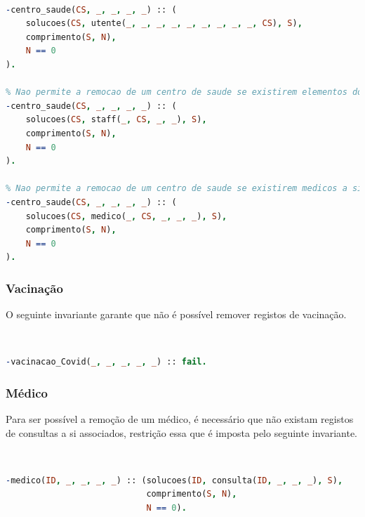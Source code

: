 \documentclass[a4paper, 11pt]{article}
\begin{document}
\

\begin{lstlisting}[language=Prolog, caption={Invariantes de remoção relativos ao predicado \texttt{centro\_saude}}]
% Nao permite a remocao de um centro de saude se existirem utentes a si associaos
-centro_saude(CS, _, _, _, _) :: (
    solucoes(CS, utente(_, _, _, _, _, _, _, _, _, CS), S),
    comprimento(S, N),
    N == 0
).

% Nao permite a remocao de um centro de saude se existirem elementos do staff a si associaos
-centro_saude(CS, _, _, _, _) :: (
    solucoes(CS, staff(_, CS, _, _), S),
    comprimento(S, N),
    N == 0
).

% Nao permite a remocao de um centro de saude se existirem medicos a si associaos
-centro_saude(CS, _, _, _, _) :: (
    solucoes(CS, medico(_, CS, _, _, _), S),
    comprimento(S, N),
    N == 0
).
\end{lstlisting}

\subsubsection*{Vacinação}

O seguinte invariante garante que não é possível remover registos de vacinação.

\

\begin{lstlisting}[language=Prolog, caption={Invariante de remoção relativos ao predicado \texttt{vacinacao\_covid}}]
% Nao permite a remocao de registos de atos de vacinacao
-vacinacao_Covid(_, _, _, _, _) :: fail.
\end{lstlisting}

\subsubsection*{Médico}

Para ser possível a remoção de um médico, é necessário que não existam registos de consultas a si associados, restrição
essa que é imposta pelo seguinte invariante.

\

\begin{lstlisting}[language=Prolog, caption={Invariante de remoção relativo ao predicado \texttt{medico}}]
% Nao permite a remocao de um medico se existirem consultas a si associadas
-medico(ID, _, _, _, _) :: (solucoes(ID, consulta(ID, _, _, _), S),
                            comprimento(S, N),
                            N == 0).
\end{lstlisting}
\end{document}

